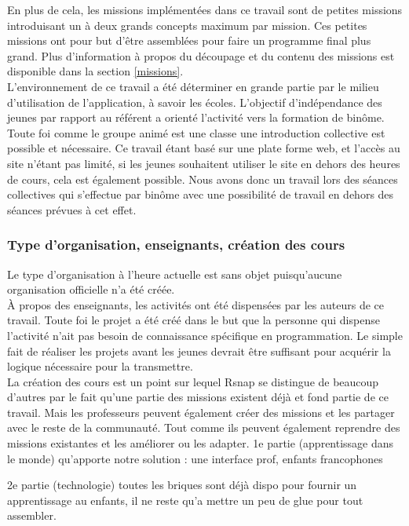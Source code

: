 En plus de cela, les missions implémentées dans ce travail sont de petites missions introduisant un à deux grands concepts maximum par mission. Ces petites missions ont pour but d'être assemblées pour faire un programme final plus grand. Plus d'information à propos du découpage et du contenu des missions est disponible dans la section \ref{missions}.\\

L'environnement de ce travail a été déterminer en grande partie par le milieu d'utilisation de l'application, à savoir les écoles. L'objectif d'indépendance des jeunes par rapport au référent a orienté l'activité vers la formation de binôme. Toute foi comme le groupe animé est une classe une introduction collective est possible et nécessaire. Ce travail étant basé sur une plate forme web, et l'accès au site n'étant pas limité, si les jeunes souhaitent utiliser le site en dehors des heures de cours, cela est également possible.
Nous avons donc un travail lors des séances collectives qui s'effectue par binôme avec une possibilité de travail en dehors des séances prévues à cet effet.

\subsubsection{Type d'organisation, enseignants, création des cours}
Le type d'organisation à l'heure actuelle est sans objet puisqu'aucune organisation officielle n'a été créée.\\

À propos des enseignants, les activités ont été dispensées par les auteurs de ce travail. Toute foi le projet a été créé dans le but que la personne qui dispense l'activité n'ait pas besoin de connaissance spécifique en programmation. Le simple fait de réaliser les projets avant les jeunes devrait être suffisant pour acquérir la logique nécessaire pour la transmettre.\\

La création des cours est un point sur lequel Rsnap se distingue de beaucoup d'autres par le fait qu'une partie des missions existent déjà et fond partie de ce travail. Mais les professeurs peuvent également créer des missions et les partager avec le reste de la communauté. Tout comme ils peuvent également reprendre des missions existantes et les améliorer ou les adapter. %
1e partie (apprentissage dans le monde) qu'apporte notre solution : une interface prof, enfants francophones

2e partie (technologie) toutes les briques sont déjà dispo pour fournir un apprentissage au enfants, il ne reste qu'a mettre un peu de glue pour tout assembler.
